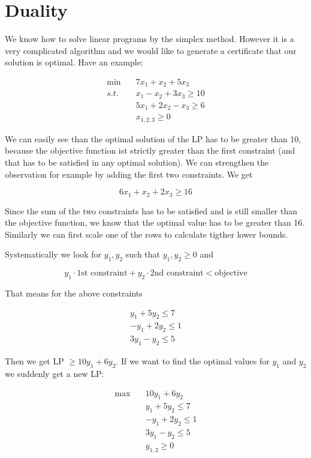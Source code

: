 \section{Duality}

We know how to solve linear programs by the simplex method. However it is a very complicated algorithm and we would like to generate a certificate that our solution is optimal. Have an example:

\begin{align*}
\min \quad & 7x_1+x_2+5x_3\\
s.t.\quad & x_1 -x_2 +3x_3 \geq 10\\
& 5x_1+2x_2-x_3 \geq 6\\
&x_{1,2,3} \geq 0
\end{align*}

We can easily see than the optimal solution of the LP has to be greater than 10, because the objective function ist strictly greater than the first constraint (and that has to be satisfied in any optimal solution). We can strengthen the observation for example by adding the first two constraints. We get

\[6x_1+x_2+2x_3\geq 16\]

Since the sum of the two constraints has to be satisfied and is still smaller than the objective function, we know that the optimal value has to be greater than 16. Similarly we can first scale one of the rows to calculate tigther lower bounds. 

Systematically we look for $y_1,y_2$ such that $y_1,y_2\geq 0$ and

\[y_1 \cdot \text{1st constraint} + y_2 \cdot \text{2nd constraint} < \text{objective}\]

That means for the above constraints

\begin{align*}
y_1+5y_2 \leq 7\\
-y_1 +2y_2 \leq 1\\
3y_1 - y_2 \leq 5
\end{align*}

Then we get LP $\geq 10y_1 + 6y_2$. If we want to find the optimal values for $y_1$ and $y_2$ we suddenly get a new LP:

\begin{align*}
\max \quad & 10y_1 +6y_2\\
&y_1 + 5y_2 \leq 7\\
&-y_1+2y_2 \leq 1\\
&3y_1 -y_2 \leq 5\\
&y_{1,2} \geq 0
\end{align*}

